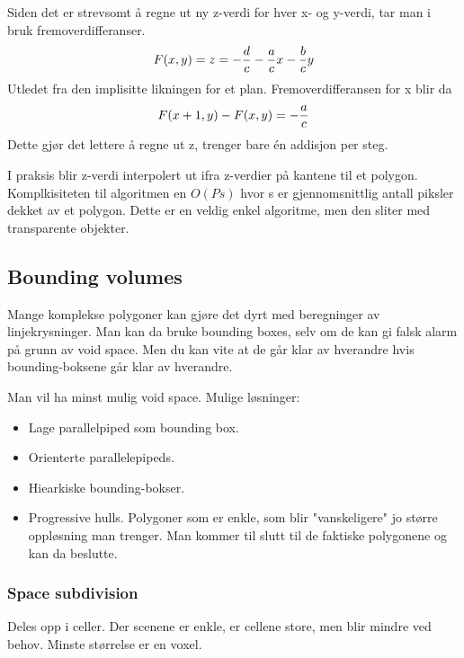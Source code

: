Siden det er strevsomt å regne ut ny z-verdi for hver x- og y-verdi, tar man i bruk fremoverdifferanser.
\begin{equation}
    F(x,y) = z = - {d \over c} - {a \over c}x - {b \over c}y
\end{equation}
Utledet fra den implisitte likningen for et plan. Fremoverdifferansen for x blir da
\begin{equation}
    F(x+1,y)-F(x,y) = - {a \over c}
\end{equation}
Dette gjør det lettere å regne ut z, trenger bare én addisjon per steg.

I praksis blir z-verdi interpolert ut ifra z-verdier på kantene til et polygon. Komplkisiteten til algoritmen en $O(Ps)$ hvor s er gjennomsnittlig antall piksler dekket av et polygon. Dette er en veldig enkel algoritme, men den sliter med transparente objekter.

\subsection{Bounding volumes}
Mange komplekse polygoner kan gjøre det dyrt med beregninger av linjekrysninger. Man kan da bruke bounding boxes, selv om de kan gi falsk alarm på grunn av void space. Men du kan vite at de går klar av hverandre hvis bounding-boksene går klar av hverandre.

Man vil ha minst mulig void space. Mulige løsninger:
\begin{itemize}
    \item Lage parallelpiped som bounding box.
    \item Orienterte parallelepipeds.
    \item Hiearkiske bounding-bokser.
    \item Progressive hulls. Polygoner som er enkle, som blir "vanskeligere" jo større oppløsning man trenger. Man kommer til slutt til de faktiske polygonene og kan da beslutte.
\end{itemize}

\subsubsection{Space subdivision}
Deles opp i celler. Der scenene er enkle, er cellene store, men blir mindre ved behov. Minste størrelse er en voxel.

